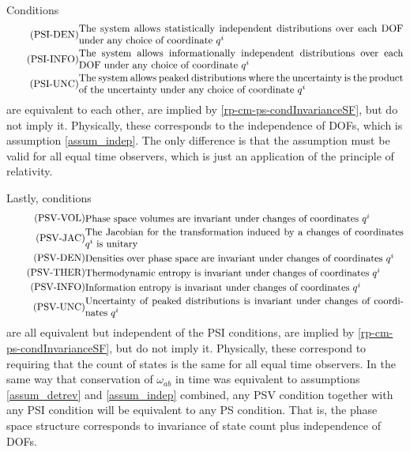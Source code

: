 Conditions
\begin{align}
	\tag{PSI-DEN}\label{rp-cm-ps-condInvarianceIndepDensities}
	&\eqtext{The system allows statistically independent distributions over each DOF under any choice of coordinate $q^i$} \\
	\tag{PSI-INFO}\label{rp-cm-ps-condInvarianceIndepEntropy}
	&\eqtext{The system allows informationally independent distributions over each DOF under any choice of coordinate $q^i$} \\
	\tag{PSI-UNC}\label{rp-cm-ps-condInvarianceIndepUncertainty}
	&\eqtext{The system allows peaked distributions where the uncertainty is the product of the uncertainty under any choice of coordinate $q^i$}
\end{align}
are equivalent to each other, are implied by \ref{rp-cm-ps-condInvarianceSF}, but do not imply it. Physically, these corresponds to the independence of DOFs, which is assumption \ref{assum_indep}. The only difference is that the assumption must be valid for all equal time observers, which is just an application of the principle of relativity.

Lastly, conditions
\begin{align}
	\tag{PSV-VOL}\label{rp-cm-ps-condInvariantVolume}
	&\eqtext{Phase space volumes are invariant under changes of coordinates $q^i$} \\
	\tag{PSV-JAC}\label{rp-cm-ps-condUnitaryJacobian}
	&\eqtext{The Jacobian for the transformation induced by a changes of coordinates $q^i$ is unitary} \\
	\tag{PSV-DEN}\label{rp-cm-ps-condConservedDensities}
	&\eqtext{Densities over phase space are invariant under changes of coordinates $q^i$} \\
	\tag{PSV-THER}\label{rp-cm-ps-condInvariantEntropy}
	&\eqtext{Thermodynamic entropy is invariant under changes of coordinates $q^i$} \\
	\tag{PSV-INFO}\label{rp-cm-ps-condInvariantInformation}
	&\eqtext{Information entropy is invariant under changes of coordinates $q^i$} \\
	\tag{PSV-UNC}\label{rp-cm-ps-condInvariantUncertainty}
	&\eqtext{Uncertainty of peaked distributions is invariant under changes of coordinates $q^i$}
\end{align}
are all equivalent but independent of the PSI conditions, are implied by \ref{rp-cm-ps-condInvarianceSF}, but do not imply it. Physically, these correspond to requiring that the count of states is the same for all equal time observers. In the same way that conservation of $\omega_{ab}$ in time was equivalent to assumptions \ref{assum_detrev} and \ref{assum_indep} combined, any PSV condition together with any PSI condition will be equivalent to any PS condition. That is, the phase space structure corresponds to invariance of state count plus independence of DOFs.

